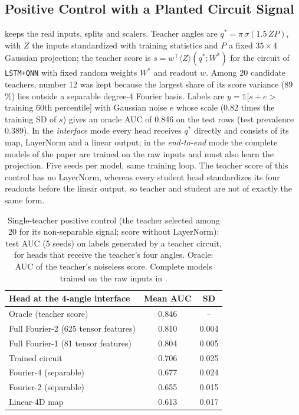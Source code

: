 \documentclass[11pt,a4paper]{article}
\begin{document}
\subsection{Positive Control with a Planted Circuit Signal}
\label{app:teacher}

 keeps the real inputs, splits and scalers. Teacher angles are $q^\ast=\pi\,\sigma(1.5\,ZP)$, with $Z$ the inputs standardized with training statistics and $P$ a fixed $35\times4$ Gaussian projection; the teacher score is $s=w^\top\langle Z\rangle(q^\ast;W^\ast)$ for the circuit of \texttt{LSTM+QNN} with fixed random weights $W^\ast$ and readout $w$. Among 20 candidate teachers, number 12 was kept because the largest share of its score variance (89\,\%) lies outside a separable degree-4 Fourier basis. Labels are $y=\mathbb 1[s+e>$ training 60th percentile$]$ with Gaussian noise $e$ whose scale (0.82 times the training SD of $s$) gives an oracle AUC of 0.846 on the test rows (test prevalence 0.389). In the \emph{interface} mode every head receives $q^\ast$ directly and consists of its map, LayerNorm and a linear output; in the \emph{end-to-end} mode the complete models of the paper are trained on the raw inputs and must also learn the projection. Five seeds per model, same training loop. The teacher score of this control has no LayerNorm, whereas every student head standardizes its four readouts before the linear output, so teacher and student are not of exactly the same form.

\begin{table}[htbp]
\centering
\caption{Single-teacher positive control (the teacher selected among 20 for its non-separable signal; score without LayerNorm): test AUC (5 seeds) on labels generated by a teacher circuit, for heads that receive the teacher's four angles. Oracle: AUC of the teacher's noiseless score. Complete models trained on the raw inputs in .}
\label{tab:teacher_single}
{\small
\begin{tabular}{lcc}
\toprule
\textbf{Head at the 4-angle interface} & \textbf{Mean AUC} & \textbf{SD} \\
\midrule
Oracle (teacher score) & 0.846 & -- \\
\midrule
Full Fourier-2 (625 tensor features) & 0.810 & 0.004 \\
Full Fourier-1 (81 tensor features) & 0.804 & 0.005 \\
Trained circuit & 0.706 & 0.025 \\
Fourier-4 (separable) & 0.677 & 0.024 \\
Fourier-2 (separable) & 0.655 & 0.015 \\
Linear-4D map & 0.613 & 0.017 \\
\bottomrule
\end{tabular}}
\end{table}
\end{document}
